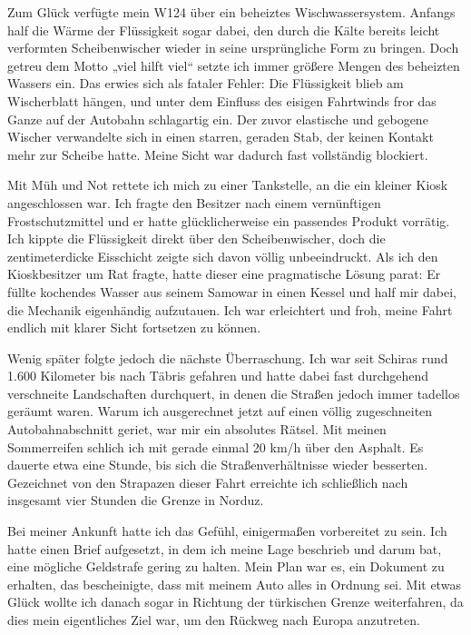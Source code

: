 Zum Glück verfügte mein W124 über ein beheiztes Wischwassersystem. Anfangs half die Wärme der Flüssigkeit sogar dabei, den durch die Kälte bereits leicht verformten Scheibenwischer wieder in seine ursprüngliche Form zu bringen. Doch getreu dem Motto „viel hilft viel“ setzte ich immer größere Mengen des beheizten Wassers ein. Das erwies sich als fataler Fehler: Die Flüssigkeit blieb am Wischerblatt hängen, und unter dem Einfluss des eisigen Fahrtwinds fror das Ganze auf der Autobahn schlagartig ein. Der zuvor elastische und gebogene Wischer verwandelte sich in einen starren, geraden Stab, der keinen Kontakt mehr zur Scheibe hatte. Meine Sicht war dadurch fast vollständig blockiert.

Mit Müh und Not rettete ich mich zu einer Tankstelle, an die ein kleiner Kiosk angeschlossen war. Ich fragte den Besitzer nach einem vernünftigen Frostschutzmittel und er hatte glücklicherweise ein passendes Produkt vorrätig. Ich kippte die Flüssigkeit direkt über den Scheibenwischer, doch die zentimeterdicke Eisschicht zeigte sich davon völlig unbeeindruckt. Als ich den Kioskbesitzer um Rat fragte, hatte dieser eine pragmatische Lösung parat: Er füllte kochendes Wasser aus seinem Samowar in einen Kessel und half mir dabei, die Mechanik eigenhändig aufzutauen. Ich war erleichtert und froh, meine Fahrt endlich mit klarer Sicht fortsetzen zu können.

Wenig später folgte jedoch die nächste Überraschung. Ich war seit Schiras rund 1.600 Kilometer bis nach Täbris gefahren und hatte dabei fast durchgehend verschneite Landschaften durchquert, in denen die Straßen jedoch immer tadellos geräumt waren. Warum ich ausgerechnet jetzt auf einen völlig zugeschneiten Autobahnabschnitt geriet, war mir ein absolutes Rätsel. Mit meinen Sommerreifen schlich ich mit gerade einmal 20 km/h über den Asphalt. Es dauerte etwa eine Stunde, bis sich die Straßenverhältnisse wieder besserten. Gezeichnet von den Strapazen dieser Fahrt erreichte ich schließlich nach insgesamt vier Stunden die Grenze in Norduz.

Bei meiner Ankunft hatte ich das Gefühl, einigermaßen vorbereitet zu sein. Ich hatte einen Brief aufgesetzt, in dem ich meine Lage beschrieb und darum bat, eine mögliche Geldstrafe gering zu halten. Mein Plan war es, ein Dokument zu erhalten, das bescheinigte, dass mit meinem Auto alles in Ordnung sei. Mit etwas Glück wollte ich danach sogar in Richtung der türkischen Grenze weiterfahren, da dies mein eigentliches Ziel war, um den Rückweg nach Europa anzutreten.

